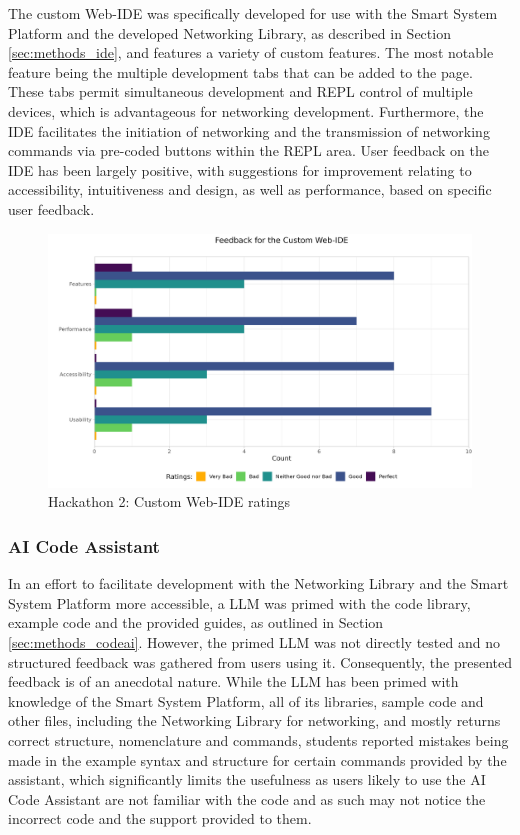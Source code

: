 The custom Web-IDE was specifically developed for use with the Smart System Platform and the developed Networking Library, as described in Section \ref{sec:methods_ide}, and features a variety of custom features. The most notable feature being the multiple development tabs that can be added to the page. These tabs permit simultaneous development and REPL control of multiple devices, which is advantageous for networking development. Furthermore, the IDE facilitates the initiation of networking and the transmission of networking commands via pre-coded buttons within the REPL area. User feedback on the IDE has been largely positive, with suggestions for improvement relating to accessibility, intuitiveness and design, as well as performance, based on specific user feedback.

\begin{figure}[H]
    \centering
    \includegraphics[width=.75\linewidth]{rstudio/survey/plots/ide.png}
    \vspace{\ftspace}
    \caption{Hackathon 2: Custom Web-IDE ratings}
    \vspace{\ftspace}
    \label{fig:website}
\end{figure}

\subsubsection{\label{sec:res_ai_code}AI Code Assistant}
In an effort to facilitate development with the Networking Library and the Smart System Platform more accessible, a LLM was primed with the code library, example code and the provided guides, as outlined in Section \ref{sec:methods_codeai}. However, the primed LLM was not directly tested and no structured feedback was gathered from users using it. Consequently, the presented feedback is of an anecdotal nature. While the LLM has been primed with knowledge of the Smart System Platform, all of its libraries, sample code and other files, including the Networking Library for networking, and mostly returns correct structure, nomenclature and commands, students reported mistakes being made in the example syntax and structure for certain commands provided by the assistant, which significantly limits the usefulness as users likely to use the AI Code Assistant are not familiar with the code and as such may not notice the incorrect code and the support provided to them.

